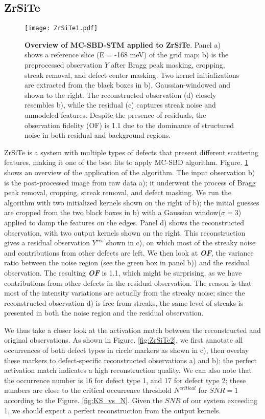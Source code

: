 \subsection{ZrSiTe}

\begin{figure}
	\texttt{[image: ZrSiTe1.pdf]} 
	\centering
	\caption[\textbf{Overview of MC-SBD-STM applied to ZrSiTe}]{\textbf{Overview of MC-SBD-STM applied to ZrSiTe}. Panel a) shows a reference slice (E = -168 meV) of the grid map; b) is the preprocessed observation $Y$ after Bragg peak masking, cropping, streak removal, and defect center masking. Two kernel initializations are extracted from the black boxes in b), Gaussian-windowed and shown to the right. The reconstructed observation (d) closely resembles b), while the residual (c) captures streak noise and unmodeled features. Despite the presence of residuals, the observation fidelity (OF) is 1.1 due to the dominance of structured noise in both residual and background regions.}
	\label{fig:ZrSiTe1}
\end{figure}
ZrSiTe is a system with multiple types of defects that present different scattering features, making it one of the best fits to apply \ac{MC-SBD} algorithm. Figure. \ref{fig:ZrSiTe1} shows an overview of the application of the algorithm. The input observation b) is the post-processed image from raw data a); it underwent the process of Bragg peak removal, cropping, streak removal, and defect masking. We run the algorithm with two initialized kernels shown on the right of b); the initial guesses are cropped from the two black boxes in b) with a Gaussian window($\sigma = 3$) applied to damp the features on the edges. Panel d) shows the reconstructed observation, with two output kernels shown on the right. This reconstruction gives a residual observation $Y^{res}$ shown in c), on which most of the streaky noise and contributions from other defects are left. We then look at \textbf{\textit{OF}}, the variance ratio between the noise region (see the green box in panel b)) and the residual observation. The resulting \textbf{\textit{OF}} is 1.1, which might be surprising, as we have contributions from other defects in the residual observation. The reason is that most of the intensity variations are actually from the streaky noise; since the reconstructed observation d) is free from streaks, the same level of streaks is presented in both the noise region and the residual observation. 

We thus take a closer look at the activation match between the reconstructed and original observations. As shown in Figure. \ref{fig:ZrSiTe2}, we first annotate all occurrences of both defect types in circle markers as shown in c), then overlay these markers to defect-specific reconstructed observations a) and b); the perfect activation match indicates a high reconstruction quality. We can also note that the occurrence number is 16 for defect type 1, and 17 for defect type 2; these numbers are close to the critical occurrence threshold $N^{critical}$ for $SNR=1$ according to the Figure. \ref{fig:KS_vs_N}. Given the $SNR$ of our system exceeding 1, we should expect a perfect reconstruction from the output kernels.

